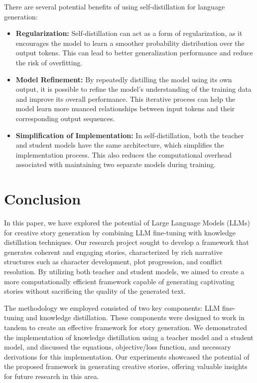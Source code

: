 \documentclass{article} %
\begin{document}
There are several potential benefits of using self-distillation for language generation:
\begin{itemize}
    \item \textbf{Regularization:} Self-distillation can act as a form of regularization, as it encourages the model to learn a smoother probability distribution over the output tokens. This can lead to better generalization performance and reduce the risk of overfitting.

    \item \textbf{Model Refinement:} By repeatedly distilling the model using its own output, it is possible to refine the model's understanding of the training data and improve its overall performance. This iterative process can help the model learn more nuanced relationships between input tokens and their corresponding output sequences.

    \item \textbf{Simplification of Implementation:} In self-distillation, both the teacher and student models have the same architecture, which simplifies the implementation process. This also reduces the computational overhead associated with maintaining two separate models during training.
\end{itemize}
\section{Conclusion}
In this paper, we have explored the potential of Large Language Models (LLMs) for creative story generation by combining LLM fine-tuning with knowledge distillation techniques. Our research project sought to develop a framework that generates coherent and engaging stories, characterized by rich narrative structures such as character development, plot progression, and conflict resolution. By utilizing both teacher and student models, we aimed to create a more computationally efficient framework capable of generating captivating stories without sacrificing the quality of the generated text.

The methodology we employed consisted of two key components: LLM fine-tuning and knowledge distillation. These components were designed to work in tandem to create an effective framework for story generation. We demonstrated the implementation of knowledge distillation using a teacher model and a student model, and discussed the equations, objective/loss function, and necessary derivations for this implementation. Our experiments showcased the potential of the proposed framework in generating creative stories, offering valuable insights for future research in this area.
\end{document}
